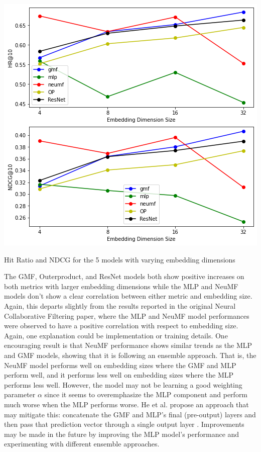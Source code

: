 \documentclass{article}
\begin{document}
\begin{center}
\includegraphics[scale=0.5]{images/Embedding_Size.png}

Hit Ratio and NDCG for the 5 models with varying embedding dimensions
\end{center}

The GMF, Outerproduct, and ResNet models both show positive increases on both metrics with larger embedding dimensions while the MLP and NeuMF models don't show a clear correlation between either metric and embedding size. Again, this departs slightly from the results reported in the original Neural Collaborative Filtering \cite{he2017neural} paper, where the MLP and NeuMF model performances were observed to have a positive correlation with respect to embedding size. Again, one explanation could be implementation or training details. One encouraging result is that NeuMF performance shows similar trends as the MLP and GMF models, showing that it is following an ensemble approach. That is, the NeuMF model performs well on embedding sizes where the GMF and MLP perform well, and it performs less well on embedding sizes where the MLP performs less well. However, the model may not be learning a good weighting parameter $\alpha$ since it seems to overemphasize the MLP component and perform much worse when the MLP performs worse. He et al. propose an approach that may mitigate this: concatenate the GMF and MLP's final (pre-output) layers and then pass that prediction vector through a single output layer \cite{he2017neural}. Improvements may be made in the future by improving the MLP model's performance and experimenting with different ensemble approaches.
\end{document}
